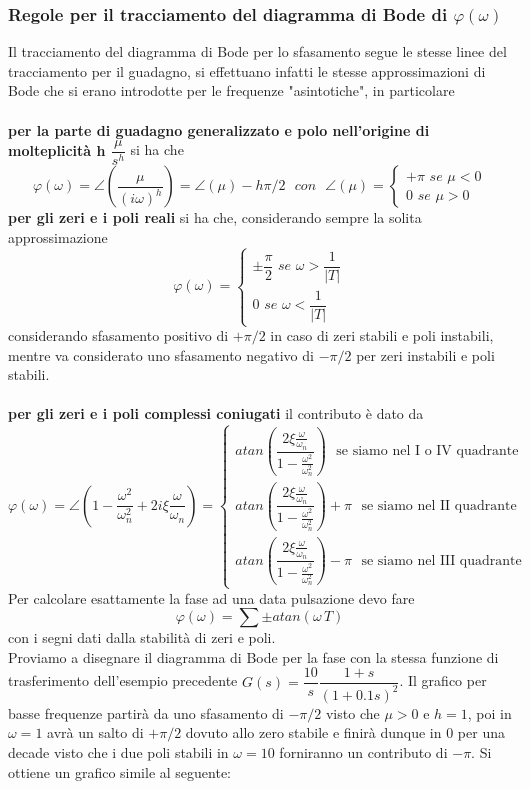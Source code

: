 \documentclass[a4paper]{article}
\begin{document}
	\subsubsection{Regole per il tracciamento del diagramma di Bode di $\varphi(\omega)$}
	Il tracciamento del diagramma di Bode per lo sfasamento segue le stesse linee del tracciamento per il guadagno, si effettuano infatti le stesse approssimazioni di Bode che si erano introdotte per le frequenze "asintotiche", in particolare 
	\\\\\textbf{per la parte di guadagno generalizzato e polo nell'origine di molteplicità h $\dfrac{\mu}{s^h}$} si ha che  
	\[\varphi(\omega)=\angle\left(\dfrac{\mu}{(i\omega)^h}\right)=\angle(\mu)-h\pi/2\,\,\,\,con\,\,\,\,\angle(\mu)=\begin{cases}
	+\pi \,\,se\,\, \mu<0\\
	0 \,\,se\,\, \mu>0
	\end{cases}\]
	\textbf{per gli zeri e i poli reali} si ha che, considerando sempre la solita approssimazione
	\[\varphi(\omega)=\begin{cases}
	\pm\dfrac{\pi}{2} \,\,se\,\, \omega>\dfrac{1}{|T|}\\
	0 \,\,se\,\, \omega<\dfrac{1}{|T|}
	\end{cases}\]
	considerando sfasamento positivo di $+\pi/2$ in caso di zeri stabili e poli instabili, mentre va considerato uno sfasamento negativo di $-\pi/2$ per zeri instabili e poli stabili.
	\\\\\textbf{per gli zeri e i poli complessi coniugati} il contributo è dato da
	\[\varphi(\omega)=\angle\left(1-\dfrac{\omega^2}{\omega_n^2}+2i\xi\dfrac{\omega}{\omega_n}\right)=\begin{cases}
	atan\left(\dfrac{2\xi\frac{\omega}{\omega_n}}{1-\frac{\omega^2}{\omega_n^2}}\right) \,\,\text{ se siamo nel I o IV quadrante}\\
	atan\left(\dfrac{2\xi\frac{\omega}{\omega_n}}{1-\frac{\omega^2}{\omega_n^2}}\right)+\pi \,\,\text{ se siamo nel II quadrante}\\
	atan\left(\dfrac{2\xi\frac{\omega}{\omega_n}}{1-\frac{\omega^2}{\omega_n^2}}\right)-\pi \,\,\text{ se siamo nel III quadrante}
	\end{cases}\]
	Per calcolare esattamente la fase ad una data pulsazione devo fare \[\varphi(\omega)=\sum\pm atan(\omega\,T)\] con i segni dati dalla stabilità di zeri e poli.
\\
	Proviamo a disegnare il diagramma di Bode per la fase con la stessa funzione di trasferimento dell'esempio precedente $G(s)=\dfrac{10}{s}\dfrac{1+s}{(1+0.1s)^2}$. Il grafico per basse frequenze partirà da uno sfasamento di $-\pi/2$ visto che $\mu>0$ e $h=1$, poi in $\omega=1$ avrà un salto di $+\pi/2$ dovuto allo zero stabile e finirà dunque in 0 per una decade visto che i due poli stabili in $\omega=10$ forniranno un contributo di $-\pi$. Si ottiene un grafico simile al seguente:
\end{document}
